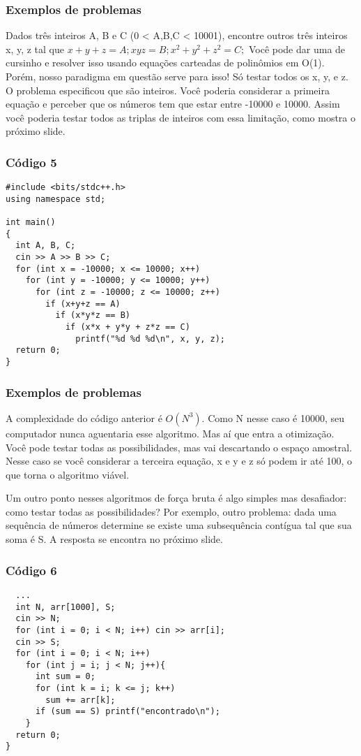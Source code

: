 \documentclass{beamer}
\begin{document}
	\begin{frame}
	\frametitle{Exemplos de problemas}
		Dados três inteiros A, B e C (0 < A,B,C < 10001), encontre outros três
		inteiros x, y, z tal que $x + y + z = A; xyz = B; x^{2}+ y^{2} + z^{2} = C;$
		Você pode dar uma de cursinho e resolver isso usando equações carteadas de
		polinômios em O(1). Porém, nosso paradigma em questão serve para isso! Só testar
		todos os x, y, e z. O problema especificou que são inteiros. Você poderia considerar a
		primeira equação e perceber que os números tem que estar entre -10000 e 10000. Assim
		você poderia testar todos as triplas de inteiros com essa limitação, como mostra
		o próximo slide.
	\end{frame}

	\begin{frame}[fragile]
	\frametitle{Código 5}
		\begin{lstlisting}
#include <bits/stdc++.h>
using namespace std;

int main()
{
  int A, B, C;
  cin >> A >> B >> C;
  for (int x = -10000; x <= 10000; x++)
    for (int y = -10000; y <= 10000; y++)
      for (int z = -10000; z <= 10000; z++)
        if (x+y+z == A)
          if (x*y*z == B)
            if (x*x + y*y + z*z == C)
              printf("%d %d %d\n", x, y, z);
  return 0;	
}
		\end{lstlisting}
	\end{frame}

	\begin{frame}
	\frametitle{Exemplos de problemas}
		A complexidade do código anterior é $O(N^{3})$. Como N nesse caso é 10000,
		seu computador nunca aguentaria esse algoritmo. Mas aí que entra a otimização.
		Você pode testar todas as possibilidades, mas vai descartando o espaço amostral.
		Nesse caso se você considerar a terceira equação, x e y e z só podem ir até 100,
		o que torna o algoritmo viável.\par
		Um outro ponto nesses algoritmos de força bruta
		é algo simples mas desafiador: como testar todas as possibilidades? Por
		exemplo, outro problema: dada uma sequência de números determine se existe 
		uma subsequência contígua tal que sua soma é S. A resposta se encontra no
		próximo slide.
	\end{frame}

	\begin{frame}[fragile]
	\frametitle{Código 6}
		\begin{lstlisting}
  ...
  int N, arr[1000], S;
  cin >> N;
  for (int i = 0; i < N; i++) cin >> arr[i];
  cin >> S;
  for (int i = 0; i < N; i++)
    for (int j = i; j < N; j++){
      int sum = 0;
      for (int k = i; k <= j; k++)
        sum += arr[k];
      if (sum == S) printf("encontrado\n");
    }
  return 0;	
}
		\end{lstlisting}
	\end{frame}
\end{document}
